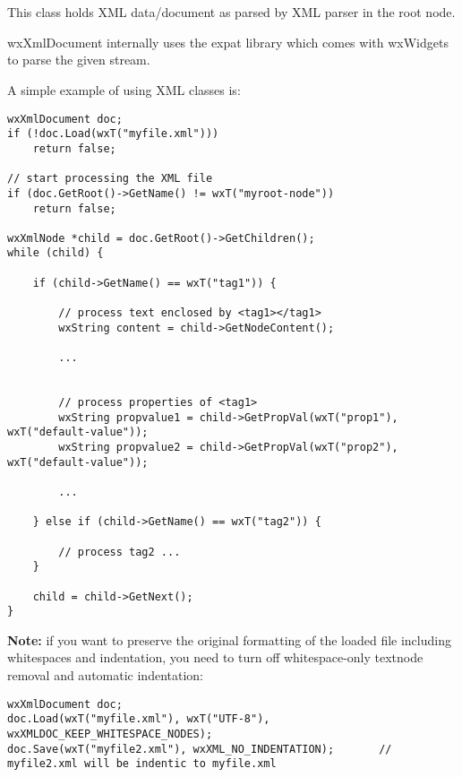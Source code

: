 
\section{}\label{wxxmldocument}

This class holds XML data/document as parsed by XML parser in the root node.

wxXmlDocument internally uses the expat library which comes with wxWidgets to parse the given stream.

A simple example of using XML classes is:

\begin{verbatim}
wxXmlDocument doc;
if (!doc.Load(wxT("myfile.xml")))
    return false;

// start processing the XML file
if (doc.GetRoot()->GetName() != wxT("myroot-node"))
    return false;

wxXmlNode *child = doc.GetRoot()->GetChildren();
while (child) {

    if (child->GetName() == wxT("tag1")) {

        // process text enclosed by <tag1></tag1>
        wxString content = child->GetNodeContent();

        ...


        // process properties of <tag1>
        wxString propvalue1 = child->GetPropVal(wxT("prop1"), wxT("default-value"));
        wxString propvalue2 = child->GetPropVal(wxT("prop2"), wxT("default-value"));

        ...

    } else if (child->GetName() == wxT("tag2")) {

        // process tag2 ...
    }

    child = child->GetNext();
}
\end{verbatim}

{\bf Note:} if you want to preserve the original formatting of the loaded file including whitespaces
and indentation, you need to turn off whitespace-only textnode removal and automatic indentation:

\begin{verbatim}
wxXmlDocument doc;
doc.Load(wxT("myfile.xml"), wxT("UTF-8"), wxXMLDOC_KEEP_WHITESPACE_NODES);
doc.Save(wxT("myfile2.xml"), wxXML_NO_INDENTATION);       // myfile2.xml will be indentic to myfile.xml
\end{verbatim}

